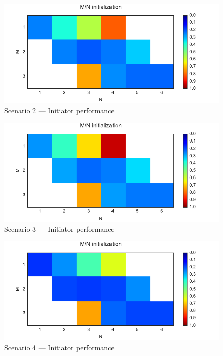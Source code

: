 \begin{figure}
 \centering
 \includegraphics{Figures/plots/Scenario2_Init-Performance.pdf}
 \caption{Scenario 2 --- Initiator performance}\label{fig:init_performance_scenario2}
\end{figure}
\begin{figure}
 \centering
 \includegraphics{Figures/plots/Scenario3_Init-Performance.pdf}
 \caption{Scenario 3 --- Initiator performance}\label{fig:init_performance_scenario3}
\end{figure}
\begin{figure}
 \centering
 \includegraphics{Figures/plots/Scenario4_Init-Performance.pdf}
 \caption{Scenario 4 --- Initiator performance}\label{fig:init_performance_scenario4}
\end{figure}

